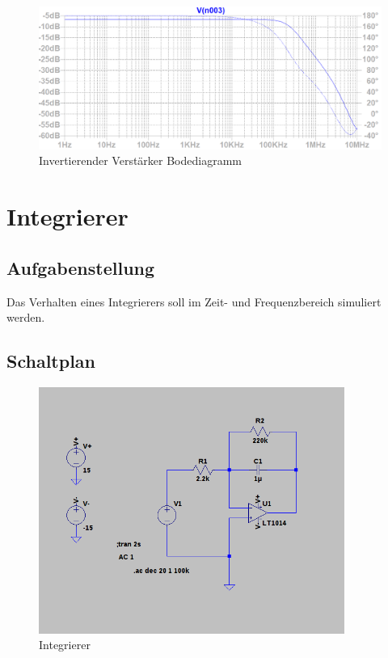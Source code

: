 \documentclass[12pt,a4paper,titlepage]{article}
\begin{document}
\begin{figure}[H]
  \centering
  \includegraphics[width=150mm]{invertierend_bode2}
  \caption{Invertierender Verst\"arker Bodediagramm}
  \label{figure16}
\end{figure}





\section{Integrierer}

\subsection{Aufgabenstellung}
Das Verhalten eines Integrierers soll im Zeit- und Frequenzbereich simuliert werden.

\subsection{Schaltplan}
\begin{figure}[H]
  \centering
  \includegraphics[width=100mm]{integrierer_schaltung.png}
  \caption{Integrierer}
\end{figure}
\end{document}
